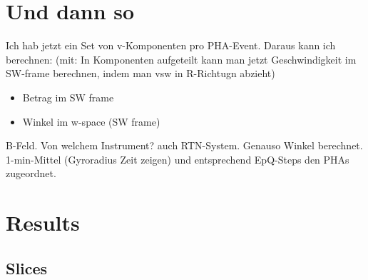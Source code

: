 


%
%
%
\section{Und dann so}
Ich hab jetzt ein Set von v-Komponenten pro PHA-Event. Daraus kann ich berechnen:
(mit: In Komponenten aufgeteilt kann man jetzt Geschwindigkeit im SW-frame berechnen, indem man vsw in R-Richtugn abzieht)
\begin{itemize}
	\item Betrag im SW frame
	\item Winkel im w-space (SW frame)
\end{itemize}
B-Feld. Von welchem Instrument? auch RTN-System. Genauso Winkel berechnet.\\
1-min-Mittel (Gyroradius Zeit zeigen) und entsprechend EpQ-Steps den PHAs zugeordnet.


%
%
%
\section{Results}
\subsection{Slices}
